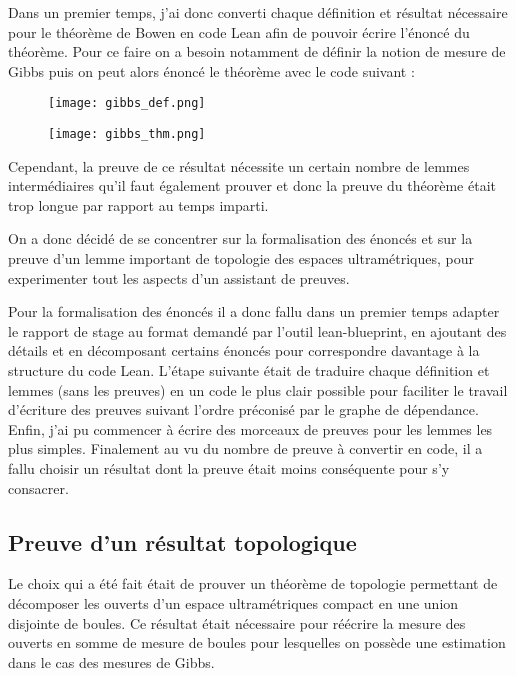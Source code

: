 \documentclass[../../rapport.tex]{subfiles}
\begin{document}
  Dans un premier temps, j'ai donc converti chaque définition et résultat nécessaire pour le théorème de Bowen en code Lean
  afin de pouvoir écrire l'énoncé du théorème.
  Pour ce faire on a besoin notamment de définir la notion de mesure de Gibbs puis on peut alors énoncé le théorème
  avec le code suivant :
  \pagebreak
  \begin{figure}[ht]
    \centering
    \texttt{[image: gibbs\_def.png]}

    \vspace{0.5cm}
    \texttt{[image: gibbs\_thm.png]}
  \end{figure}

  Cependant, la preuve de ce résultat nécessite un certain nombre de lemmes intermédiaires qu'il faut également prouver
  et donc la preuve du théorème était trop longue par rapport au temps imparti.

  On a donc décidé de se concentrer sur la formalisation des énoncés et sur la preuve d'un lemme important
  de topologie des espaces ultramétriques, pour experimenter tout les aspects d'un assistant de preuves.

  Pour la formalisation des énoncés il a donc fallu dans un premier temps adapter le rapport de stage au format demandé
  par l'outil lean-blueprint, en ajoutant des détails et en décomposant certains énoncés pour correspondre davantage à la structure
  du code Lean. L'étape suivante était de traduire chaque définition et lemmes (sans les preuves) en un code le plus clair possible
  pour faciliter le travail d'écriture des preuves suivant l'ordre préconisé par le graphe de dépendance.
  Enfin, j'ai pu commencer à écrire des morceaux de preuves pour les lemmes les plus simples.
  Finalement au vu du nombre de preuve à convertir en code, il a fallu choisir un résultat dont la
  preuve était moins conséquente pour s'y consacrer.

  \subsection{Preuve d'un résultat topologique}

  Le choix qui a été fait était de prouver un théorème de topologie permettant de décomposer les ouverts d'un espace ultramétriques compact
  en une union disjointe de boules.
  Ce résultat était nécessaire pour réécrire la mesure des ouverts en somme de mesure de boules pour lesquelles on possède une estimation
  dans le cas des mesures de Gibbs.
\end{document}
